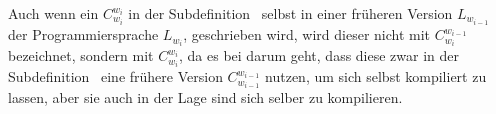\begin{Special_Paragraph}
Auch wenn ein  $C_{w_i}^{w_i}$ in der Subdefinition~ selbst in einer früheren Version $L_{w_{i-1}}$ der Programmiersprache $L_{w_i}$, geschrieben wird, wird dieser nicht mit $C_{w_i}^{w_{i-1}}$ bezeichnet, sondern mit $C_{w_i}^{w_i}$, da es bei  darum geht, dass diese zwar in der Subdefinition~ eine frühere Version $C_{w_{i-1}}^{w_{i-1}}$ nutzen, um sich selbst kompiliert zu lassen, aber sie auch in der Lage sind sich selber zu kompilieren.
\end{Special_Paragraph}
